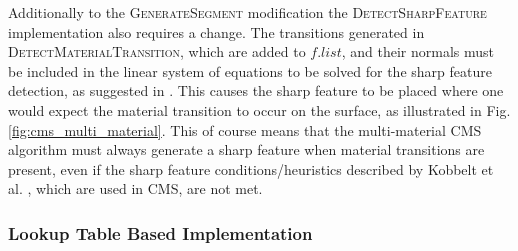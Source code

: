 Additionally to the \textsc{GenerateSegment} modification the \textsc{DetectSharpFeature} implementation also requires a change. The transitions generated in \textsc{DetectMaterialTransition}, which are added to
$f.list$, and their normals must be included in the linear system of equations to be solved \cite{cubical_marching_squares} for the sharp feature detection,
as suggested in \cite{dual_contouring}. This causes the sharp feature to be placed where one would expect the material transition to occur on the surface, as illustrated in Fig. \ref{fig:cms_multi_material}.
This of course means that the multi-material CMS algorithm must always generate a sharp feature when material transitions are present, even if the sharp feature conditions/heuristics described by Kobbelt et al. \cite{kobbelt_sharp_features} , which are used in CMS, are not met.

\subsubsection{Lookup Table Based Implementation}

